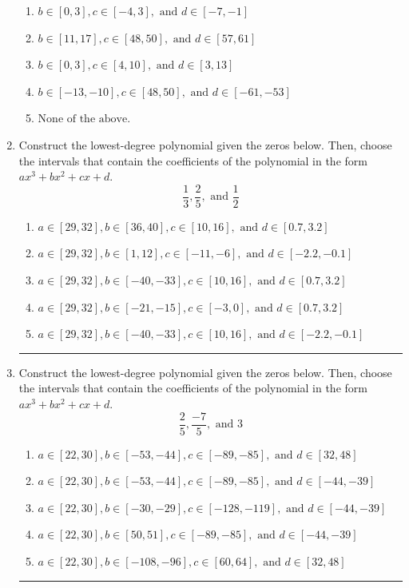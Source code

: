 \documentclass[14pt]{extbook}
\newcommand{\litem}[1]{\item#1\hspace*{-1cm}\rule{\textwidth}{0.4pt}}
\begin{document}
\begin{enumerate}
{\begin{enumerate}[label=\Alph*.]
\item \( b \in [0, 3], c \in [-4, 3], \text{ and } d \in [-7, -1] \)
\item \( b \in [11, 17], c \in [48, 50], \text{ and } d \in [57, 61] \)
\item \( b \in [0, 3], c \in [4, 10], \text{ and } d \in [3, 13] \)
\item \( b \in [-13, -10], c \in [48, 50], \text{ and } d \in [-61, -53] \)
\item \( \text{None of the above.} \)

\end{enumerate} }
\litem{
Construct the lowest-degree polynomial given the zeros below. Then, choose the intervals that contain the coefficients of the polynomial in the form $ax^3+bx^2+cx+d$.\[ \frac{1}{3}, \frac{2}{5}, \text{ and } \frac{1}{2} \]\begin{enumerate}[label=\Alph*.]
\item \( a \in [29, 32], b \in [36, 40], c \in [10, 16], \text{ and } d \in [0.7, 3.2] \)
\item \( a \in [29, 32], b \in [1, 12], c \in [-11, -6], \text{ and } d \in [-2.2, -0.1] \)
\item \( a \in [29, 32], b \in [-40, -33], c \in [10, 16], \text{ and } d \in [0.7, 3.2] \)
\item \( a \in [29, 32], b \in [-21, -15], c \in [-3, 0], \text{ and } d \in [0.7, 3.2] \)
\item \( a \in [29, 32], b \in [-40, -33], c \in [10, 16], \text{ and } d \in [-2.2, -0.1] \)

\end{enumerate} }
\litem{
Construct the lowest-degree polynomial given the zeros below. Then, choose the intervals that contain the coefficients of the polynomial in the form $ax^3+bx^2+cx+d$.\[ \frac{2}{5}, \frac{-7}{5}, \text{ and } 3 \]\begin{enumerate}[label=\Alph*.]
\item \( a \in [22, 30], b \in [-53, -44], c \in [-89, -85], \text{ and } d \in [32, 48] \)
\item \( a \in [22, 30], b \in [-53, -44], c \in [-89, -85], \text{ and } d \in [-44, -39] \)
\item \( a \in [22, 30], b \in [-30, -29], c \in [-128, -119], \text{ and } d \in [-44, -39] \)
\item \( a \in [22, 30], b \in [50, 51], c \in [-89, -85], \text{ and } d \in [-44, -39] \)
\item \( a \in [22, 30], b \in [-108, -96], c \in [60, 64], \text{ and } d \in [32, 48] \)


\end{enumerate}}
\end{enumerate}
\end{document}
